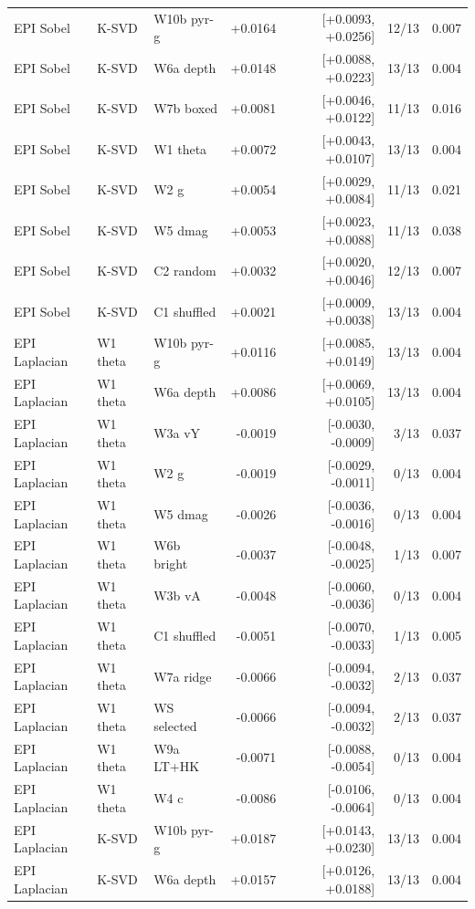 \begin{tabular}{lllrrrr}
EPI Sobel & K-SVD & W10b pyr-g & +0.0164 & [+0.0093, +0.0256] & 12/13 & 0.007 \\
EPI Sobel & K-SVD & W6a depth & +0.0148 & [+0.0088, +0.0223] & 13/13 & 0.004 \\
EPI Sobel & K-SVD & W7b boxed & +0.0081 & [+0.0046, +0.0122] & 11/13 & 0.016 \\
EPI Sobel & K-SVD & W1 theta & +0.0072 & [+0.0043, +0.0107] & 13/13 & 0.004 \\
EPI Sobel & K-SVD & W2 g & +0.0054 & [+0.0029, +0.0084] & 11/13 & 0.021 \\
EPI Sobel & K-SVD & W5 dmag & +0.0053 & [+0.0023, +0.0088] & 11/13 & 0.038 \\
EPI Sobel & K-SVD & C2 random & +0.0032 & [+0.0020, +0.0046] & 12/13 & 0.007 \\
EPI Sobel & K-SVD & C1 shuffled & +0.0021 & [+0.0009, +0.0038] & 13/13 & 0.004 \\
EPI Laplacian & W1 theta & W10b pyr-g & +0.0116 & [+0.0085, +0.0149] & 13/13 & 0.004 \\
EPI Laplacian & W1 theta & W6a depth & +0.0086 & [+0.0069, +0.0105] & 13/13 & 0.004 \\
EPI Laplacian & W1 theta & W3a vY & -0.0019 & [-0.0030, -0.0009] & 3/13 & 0.037 \\
EPI Laplacian & W1 theta & W2 g & -0.0019 & [-0.0029, -0.0011] & 0/13 & 0.004 \\
EPI Laplacian & W1 theta & W5 dmag & -0.0026 & [-0.0036, -0.0016] & 0/13 & 0.004 \\
EPI Laplacian & W1 theta & W6b bright & -0.0037 & [-0.0048, -0.0025] & 1/13 & 0.007 \\
EPI Laplacian & W1 theta & W3b vA & -0.0048 & [-0.0060, -0.0036] & 0/13 & 0.004 \\
EPI Laplacian & W1 theta & C1 shuffled & -0.0051 & [-0.0070, -0.0033] & 1/13 & 0.005 \\
EPI Laplacian & W1 theta & W7a ridge & -0.0066 & [-0.0094, -0.0032] & 2/13 & 0.037 \\
EPI Laplacian & W1 theta & WS selected & -0.0066 & [-0.0094, -0.0032] & 2/13 & 0.037 \\
EPI Laplacian & W1 theta & W9a LT+HK & -0.0071 & [-0.0088, -0.0054] & 0/13 & 0.004 \\
EPI Laplacian & W1 theta & W4 c & -0.0086 & [-0.0106, -0.0064] & 0/13 & 0.004 \\
EPI Laplacian & K-SVD & W10b pyr-g & +0.0187 & [+0.0143, +0.0230] & 13/13 & 0.004 \\
EPI Laplacian & K-SVD & W6a depth & +0.0157 & [+0.0126, +0.0188] & 13/13 & 0.004 \\

\end{tabular}
